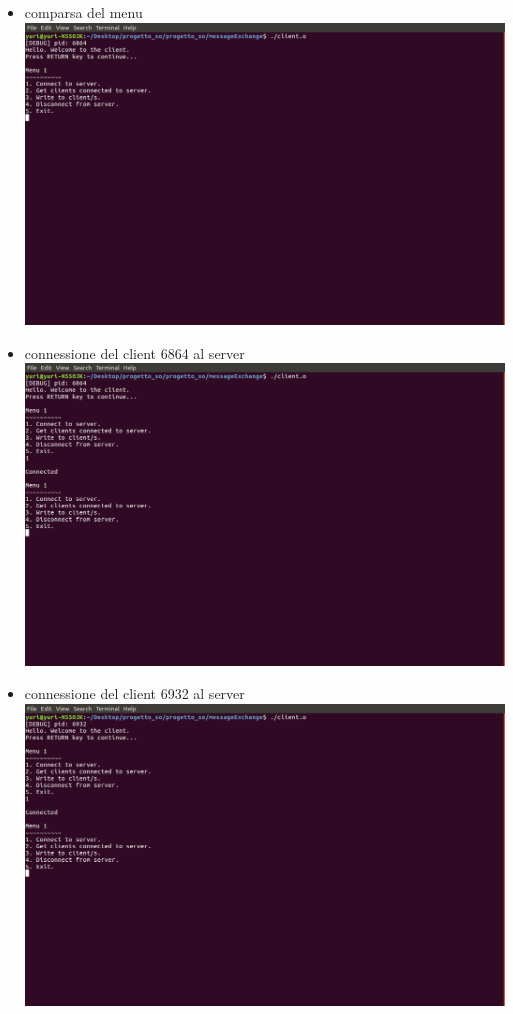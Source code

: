 \documentclass[a4paper]{article}
\begin{document}
\begin{itemize}
\item comparsa del menu \\
\includegraphics[scale=0.3]{screenmsg/2_client_6864}
\newpage
\item connessione del client 6864 al server \\
\includegraphics[scale=0.4]{screenmsg/3_client_6864}

\item connessione del client 6932 al server \\
\includegraphics[scale=0.4]{screenmsg/4_client_6932}


\end{itemize}
\end{document}
